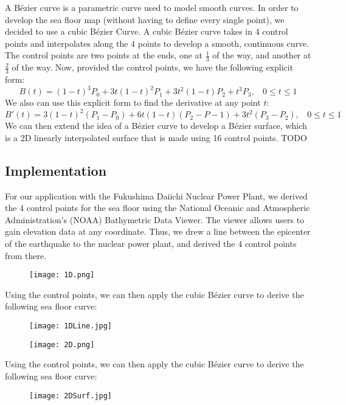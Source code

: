 \documentclass[../main.tex]{subfiles}
\begin{document}
A B\'ezier curve is a parametric curve used to model smooth curves.  In order to develop the sea floor map (without having to define every single point), we decided to use a cubic B\'ezier Curve.  A cubic B\'ezier curve takes in 4 control points and interpolates along the 4 points to develop a smooth, continuous curve.  The control points are two points at the ends, one at $\frac{1}{3}$ of the way, and another at $\frac{2}{3}$ of the way.  Now, provided the control points, we have the following explicit form:
\begin{equation}
B(t) = (1-t)^3P_0 + 3t(1-t)^2P_1 + 3t^2(1-t)P_2+t^3P_3, \ \ \ \ 0\leq t \leq 1
\end{equation}
We also can use this explicit form to find the derivative at any point $t$:
\begin{equation}
B'(t) = 3(1-t)^2(P_1-P_0) + 6t(1-t)(P_2-P-1) + 3t^2(P_3-P_2), \ \ \ \ 0\leq t \leq 1
\end{equation}
We can then extend the idea of a B\'ezier curve to develop a B\'ezier surface, which is a 2D linearly interpolated surface that is made using 16 control points. TODO

\subsection{Implementation}
For our application with the Fukushima Daiichi Nuclear Power Plant, we derived the 4 control points for the sea floor using the National Oceanic and Atmospheric Administration's (NOAA) Bathymetric Data Viewer.  The viewer allows users to gain elevation data at any coordinate.  Thus, we drew a line between the epicenter of the earthquake to the nuclear power plant, and derived the 4 control points from there.
\begin{figure}[H]
\centering
\texttt{[image: 1D.png]}
\end{figure}
\noindent Using the control points, we can then apply the cubic B\'ezier curve to derive the following sea floor curve:
\begin{figure}[H]
\centering
\texttt{[image: 1DLine.jpg]}
\end{figure}
\begin{figure}[H]
\centering
\texttt{[image: 2D.png]}
\end{figure}
\noindent Using the control points, we can then apply the cubic B\'ezier curve to derive the following sea floor curve:
\begin{figure}[H]
\centering
\texttt{[image: 2DSurf.jpg]}
\end{figure}
\end{document}
